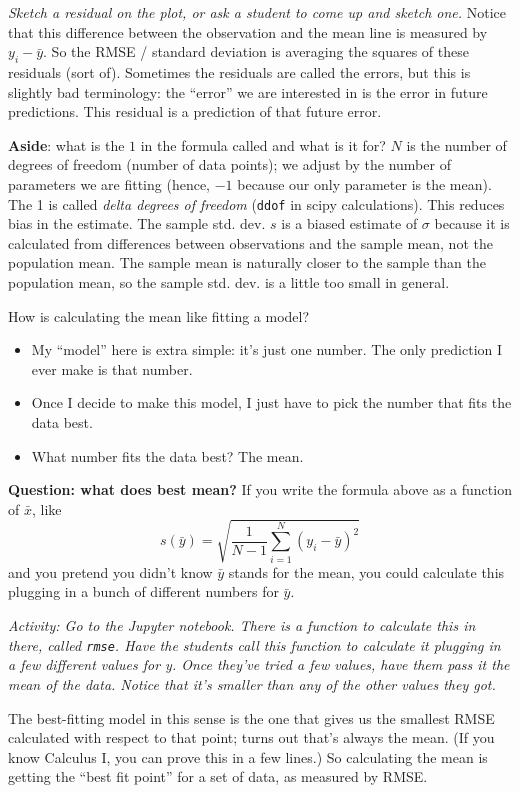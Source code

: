\documentclass{article}
\begin{document}
\textit{Sketch a residual on the plot, or ask a student to come up and sketch one.} Notice that this difference between the observation and the mean line is measured by $y_i - \bar y$. So the RMSE / standard deviation is averaging the squares of these residuals (sort of).
Sometimes the residuals are called the errors, but this is slightly bad terminology: the ``error'' we are interested in is the error in future predictions. This residual is a prediction of that future error.

\textbf{Aside}: what is the $1$ in the formula called and what is it for? $N$ is the number of degrees of freedom (number of data points); we adjust by the number of parameters we are fitting (hence, $-1$ because our only parameter is the mean). The 1 is called \emph{delta degrees of freedom} (\texttt{ddof} in scipy calculations). This reduces bias in the estimate. The sample std. dev. $s$ is a biased estimate of $\sigma$ because it is calculated from differences between observations and the sample mean, not the population mean. The sample mean is naturally closer to the sample than the population mean, so the sample std. dev. is a little too small in general.

How is calculating the mean like fitting a model?
\begin{itemize}
    \item My ``model'' here is extra simple: it's just one number. The only prediction I ever make is that number.
    \item Once I decide to make this model, I just have to pick the number that fits the data best.
    \item What number fits the data best? The mean.
\end{itemize}

\textbf{Question: what does best mean?} If you write the formula above as a function of $\bar x$, like
\[
    s(\bar y) = \sqrt{\frac{1}{N-1} \sum_{i=1}^N (y_i - \bar y)^2}
\]
and you pretend you didn't know $\bar y$ stands for the mean, you could calculate this plugging in a bunch of different numbers for $\bar y$.

\textit{Activity: Go to the Jupyter notebook. There is a function to calculate this in there, called \texttt{rmse}. Have the students call this function to calculate it plugging in a few different values for y. Once they've tried a few values, have them pass it the mean of the data. Notice that it's smaller than any of the other values they got.}

The best-fitting model in this sense is the one that gives us the smallest RMSE calculated with respect to that point; turns out that's always the mean. (If you know Calculus I, you can prove this in a few lines.) So calculating the mean is getting the ``best fit point'' for a set of data, as measured by RMSE.
\end{document}
